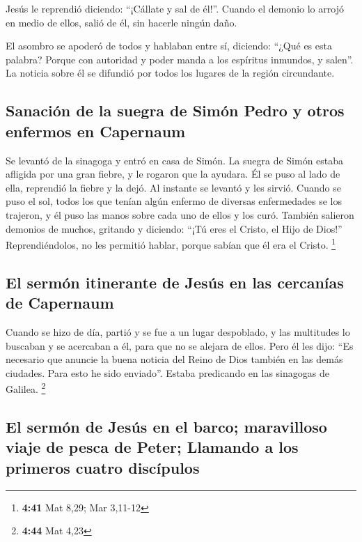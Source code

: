  Jesús le reprendió diciendo: ``¡Cállate y sal de él!''.
Cuando el demonio lo arrojó en medio de ellos, salió de él, sin hacerle
ningún daño.

 El asombro se apoderó de todos y hablaban entre sí,
diciendo: ``¿Qué es esta palabra? Porque con autoridad y poder manda a
los espíritus inmundos, y salen''.  La noticia sobre él
se difundió por todos los lugares de la región circundante.

\hypertarget{sanaciuxf3n-de-la-suegra-de-simuxf3n-pedro-y-otros-enfermos-en-capernaum}{%
\subsection{Sanación de la suegra de Simón Pedro y otros enfermos en
Capernaum}\label{sanaciuxf3n-de-la-suegra-de-simuxf3n-pedro-y-otros-enfermos-en-capernaum}}

 Se levantó de la sinagoga y entró en casa de Simón. La
suegra de Simón estaba afligida por una gran fiebre, y le rogaron que la
ayudara.  Él se puso al lado de ella, reprendió la fiebre
y la dejó. Al instante se levantó y les sirvió.  Cuando
se puso el sol, todos los que tenían algún enfermo de diversas
enfermedades se los trajeron, y él puso las manos sobre cada uno de
ellos y los curó.  También salieron demonios de muchos,
gritando y diciendo: ``¡Tú eres el Cristo, el Hijo de Dios!''
Reprendiéndolos, no les permitió hablar, porque sabían que él era el
Cristo. \footnote{\textbf{4:41} Mat 8,29; Mar 3,11-12}

\hypertarget{el-sermuxf3n-itinerante-de-jesuxfas-en-las-cercanuxedas-de-capernaum}{%
\subsection{El sermón itinerante de Jesús en las cercanías de
Capernaum}\label{el-sermuxf3n-itinerante-de-jesuxfas-en-las-cercanuxedas-de-capernaum}}

 Cuando se hizo de día, partió y se fue a un lugar
despoblado, y las multitudes lo buscaban y se acercaban a él, para que
no se alejara de ellos.  Pero él les dijo: ``Es necesario
que anuncie la buena noticia del Reino de Dios también en las demás
ciudades. Para esto he sido enviado''.  Estaba predicando
en las sinagogas de Galilea. \footnote{\textbf{4:44} Mat 4,23}

\hypertarget{el-sermuxf3n-de-jesuxfas-en-el-barco-maravilloso-viaje-de-pesca-de-peter-llamando-a-los-primeros-cuatro-discuxedpulos}{%
\subsection{El sermón de Jesús en el barco; maravilloso viaje de pesca
de Peter; Llamando a los primeros cuatro
discípulos}\label{el-sermuxf3n-de-jesuxfas-en-el-barco-maravilloso-viaje-de-pesca-de-peter-llamando-a-los-primeros-cuatro-discuxedpulos}}

